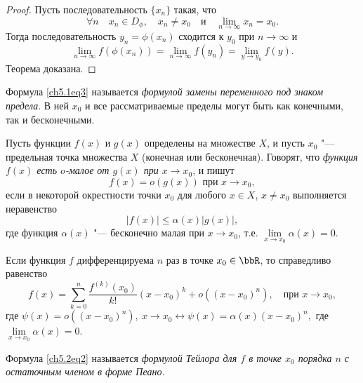 \begin{proof}
Пусть последовательность $\{ x_n \}$ такая, что 
$$
\forall n \quad x_n \in D_{\phi}, \quad x_n \not= x_0 \quad \text{и} \quad \lim_{n \to \infty} x_n = x_0.
$$
Тогда последовательность $y_n = \phi(x_n)$ сходится к $y_0$ при $n \to \infty$ и 
$$
\lim_{n \to \infty} f(\phi(x_n)) = \lim_{n \to \infty} f(y_n) = \lim_{y \to y_0} f(y).
$$
Теорема доказана.
\end{proof}

Формула \eqref{ch5.1eq3} называется \textit{формулой замены переменного под знаком предела}. В ней $x_0$ и все рассматриваемые пределы могут быть как конечными, так и бесконечными.

\begin{defn}
Пусть функции $f(x)$ и $g(x)$ определены на множестве $X$, и пусть $x_0$ "--- предельная точка множества $X$ (конечная или бесконечная). Говорят, что \textit{функция $f(x)$ есть $o$-малое от $g(x)$ при $x\to x_0$}, и пишут
$$
f(x) = o(g(x)) \text{ при } x\to x_0,
$$ 
если в некоторой окрестности точки $x_0$ для любого $x \in X$, $x\ne x_0$ выполняется неравенство\footnotemark
$$
|f(x)| \le \alpha(x)|g(x)|,
$$
где функция $\alpha(x)$ "--- бесконечно малая при $x\to x_0$, т.е. $\lim\limits_{x\to x_0}\alpha(x)= 0$.
\end{defn}

\begin{thm}
Если функция $f$ дифференцируема $n$ раз в точке $x_0 \in \bbR$, то справедливо равенство
\begin{equation} \label{ch5.2eq2}
f(x) = \sum_{k = 0}^{n} \frac{f^{(k)}(x_0)}{k!} (x - x_0)^k + o((x - x_0)^n), \quad \text{при } x \to x_0,
\end{equation}
где $\psi(x) = o((x - x_0)^n),\ x \to x_0 \leftrightarrow \psi(x) = \alpha(x) (x - x_0)^n,$ где $\lim\limits_{x \to x_0} \alpha(x) = 0$.
\end{thm}

Формула \eqref{ch5.2eq2} называется \textit{формулой Тейлора для $f$ в точке $x_0$ порядка $n$ с остаточным членом в форме Пеано.}

